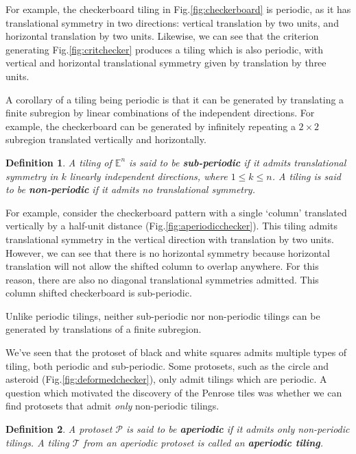 \documentclass[
  oneside,
  11pt, a4paper,
  footinclude=true,
  headinclude=true,
  cleardoublepage=empty
]{scrbook}
\newtheorem{mydef}{Definition}
\begin{document}
For example, the checkerboard tiling in Fig.\ref{fig:checkerboard} is periodic, as it has translational symmetry in two directions: vertical translation by two units, and horizontal translation by two units. Likewise, we can see that the criterion generating Fig.\ref{fig:critchecker} produces a tiling which is also periodic, with vertical and horizontal translational symmetry given by translation by three units. 

A corollary of a tiling being periodic is that it can be generated by translating a finite subregion by linear combinations of the independent directions. For example, the checkerboard can be generated by infinitely repeating a $2\times2$ subregion translated vertically and horizontally. 

\begin{mydef}
A tiling of  $\mathbb{E}^n$ is said to be \textbf{sub-periodic} if it admits translational symmetry in $k$ linearly independent directions, where $1\leq k\leq n$. A tiling is said to be \textbf{non-periodic} if it admits no translational symmetry. 
\end{mydef}

For example, consider the checkerboard pattern with a single `column' translated vertically by a half-unit distance (Fig.\ref{fig:aperiodicchecker}). This tiling admits translational symmetry in the vertical direction with translation by two units. However, we can see that there is no horizontal symmetry because horizontal translation will not allow the shifted column to overlap anywhere. For this reason, there are also no diagonal translational symmetries admitted. This column shifted checkerboard is sub-periodic. 

Unlike periodic tilings, neither sub-periodic nor non-periodic tilings can be generated by translations of a finite subregion. 

We've seen that the protoset of black and white squares admits multiple types of tiling, both periodic and sub-periodic. Some protosets, such as the circle and asteroid (Fig.\ref{fig:deformedchecker}), only admit tilings which are periodic. A question which motivated the discovery of the Penrose tiles was whether we can find protosets that admit \textit{only} non-periodic tilings.

\begin{mydef}
A protoset $\mathcal{P}$ is said to be \textbf{aperiodic} if it admits only non-periodic tilings. A tiling $\mathcal{T}$ from an aperiodic protoset is called an \textbf{aperiodic tiling}. 
\end{mydef}
\end{document}
